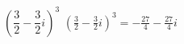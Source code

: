 { $\left(\dfrac{3}{2} - \dfrac{3}{2} i\right)^3$ }
{ $\left(\frac{3}{2} - \frac{3}{2} i\right)^3=-\frac{27}{4}-\frac{27}{4} i$ }
